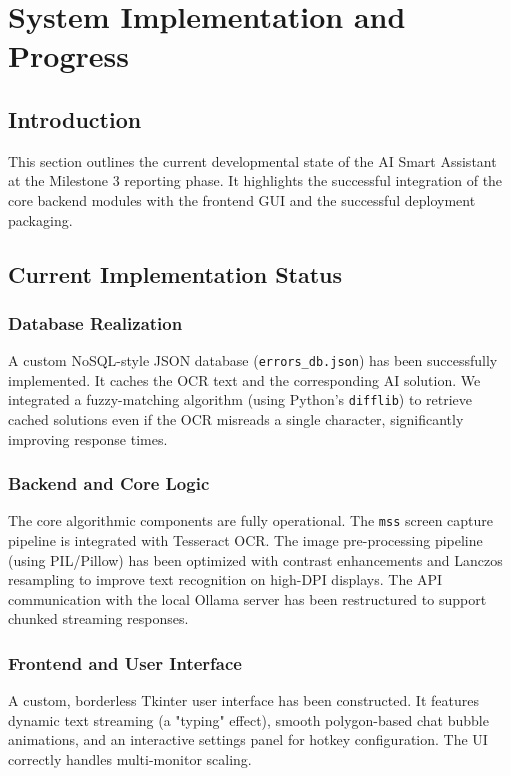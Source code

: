 \documentclass[12pt,a4paper]{report}
\begin{document}
\chapter{System Implementation and Progress}

\section{Introduction}
This section outlines the current developmental state of the AI Smart Assistant at the Milestone 3 reporting phase. It highlights the successful integration of the core backend modules with the frontend GUI and the successful deployment packaging.

\section{Current Implementation Status}
\subsection{Database Realization}
A custom NoSQL-style JSON database (\texttt{errors\_db.json}) has been successfully implemented. It caches the OCR text and the corresponding AI solution. We integrated a fuzzy-matching algorithm (using Python's \texttt{difflib}) to retrieve cached solutions even if the OCR misreads a single character, significantly improving response times.

\subsection{Backend and Core Logic}
The core algorithmic components are fully operational. The \texttt{mss} screen capture pipeline is integrated with Tesseract OCR. The image pre-processing pipeline (using PIL/Pillow) has been optimized with contrast enhancements and Lanczos resampling to improve text recognition on high-DPI displays. The API communication with the local Ollama server has been restructured to support chunked streaming responses.

\subsection{Frontend and User Interface}
A custom, borderless Tkinter user interface has been constructed. It features dynamic text streaming (a "typing" effect), smooth polygon-based chat bubble animations, and an interactive settings panel for hotkey configuration. The UI correctly handles multi-monitor scaling.
\end{document}
